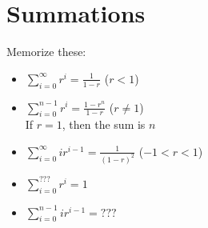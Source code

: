 \section{Summations}

Memorize these:
\begin{itemize}
    \item $\displaystyle \sum_{i=0}^{\infty} r^i = \frac{1}{1-r}$ ($r < 1$)
    \item $\displaystyle \sum_{i=0}^{n-1} r^i = \frac{1 - r^n}{1-r}$ ($r \neq 1$)\\
    If $r = 1$, then the sum is $n$
    \item $\displaystyle \sum_{i=0}^{\infty} ir^{i-1} = \frac{1}{(1-r)^2}$ ($-1 < r < 1$)
    \item $\displaystyle \sum_{i=0}^{???} r^i = 1$
    \item $\displaystyle \sum_{i=0}^{n-1} ir^{i-1} = ???$
\end{itemize}
